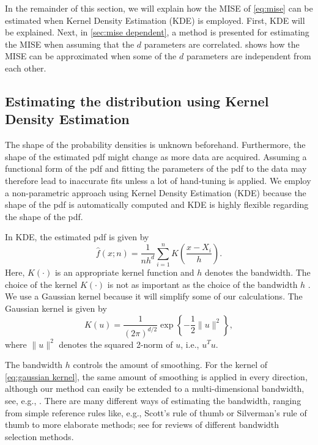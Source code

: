 In the remainder of this section, we will explain how the MISE of \cref{eq:mise} can be estimated when Kernel Density Estimation (KDE) is employed. First, KDE will be explained. Next, in \cref{sec:mise dependent}, a method is presented for estimating the MISE when assuming that the $d$ parameters are correlated.  shows how the MISE can be approximated when some of the $d$ parameters are independent from each other.

\subsection{Estimating the distribution using Kernel Density Estimation}
\label{sec:kde}

The shape of the probability densities is unknown beforehand. Furthermore, the shape of the estimated pdf might change as more data are acquired. Assuming a functional form of the pdf and fitting the parameters of the pdf to the data may therefore lead to inaccurate fits unless a lot of hand-tuning is applied. We employ a non-parametric approach using Kernel Density Estimation (KDE) \cite{rosenblatt1956remarks, parzen1962estimation} because the shape of the pdf is automatically computed and KDE is highly flexible regarding the shape of the pdf.

In KDE, the estimated pdf is given by
\begin{equation}
	\label{eq:kde}
	\hat{f}(x;n) = \frac{1}{nh^d} \sum_{i=1}^n K\left(\frac{x - X_i}{h}\right).
\end{equation}
Here, $K(\cdot)$ is an appropriate kernel function and $h$ denotes the bandwidth. The choice of the kernel $K(\cdot)$ is not as important as the choice of the bandwidth $h$ \cite{turlach1993bandwidthselection}. We use a Gaussian kernel because it will simplify some of our calculations. The Gaussian kernel is given by
\begin{equation}
	\label{eq:gaussian kernel}
	K(u) = \frac{1}{\left( 2\pi \right)^{d/2}} \exp \left\{ -\frac{1}{2} \|u\|^2 \right\},
\end{equation}
where $\|u\|^2$ denotes the squared 2-norm of $u$, i.e., $u^T u$.

The bandwidth $h$ controls the amount of smoothing. For the kernel of \cref{eq:gaussian kernel}, the same amount of smoothing is applied in every direction, although our method can easily be extended to a multi-dimensional bandwidth, see, e.g., \textcite{scott2005multidimensional, chen2017tutorial}. There are many different ways of estimating the bandwidth, ranging from simple reference rules like, e.g., Scott's rule of thumb \cite{scott2015multivariate} or Silverman's rule of thumb \cite{silverman1986density} to more elaborate methods; see \textcite{turlach1993bandwidthselection, bashtannyk2001bandwidth, jones1996brief, chiu1996comparative} for reviews of different bandwidth selection methods. 


